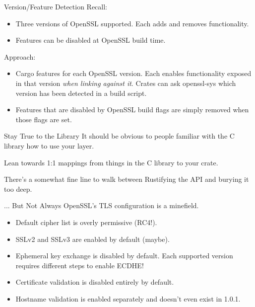 \documentclass{beamer}
\begin{document}
\begin{frame}{Version/Feature Detection}
    Recall:
    \begin{itemize}
        \item Three versions of OpenSSL supported. Each adds and removes
            functionality.
        \item Features can be disabled at OpenSSL build time.
    \end{itemize}

    Approach:
    \begin{itemize}
        \item Cargo features for each OpenSSL version. Each enables
            functionality exposed in that version \emph{when linking against
            it}. Crates can ask openssl-sys which version has been detected in
            a build script.
        \item Features that are disabled by OpenSSL build flags are simply
            removed when those flags are set.
    \end{itemize}
\end{frame}

\begin{frame}{Stay True to the Library}
    It should be obvious to people familiar with the C library how to use your
    layer.

    Lean towards 1:1 mappings from things in the C library to your crate.

    There's a somewhat fine line to walk between Rustifying the API and burying
    it too deep.
\end{frame}

\begin{frame}[fragile]{... But Not Always}
    OpenSSL's TLS configuration is a minefield.

    \begin{itemize}
        \item Default cipher list is overly permissive (RC4!).
        \item SSLv2 and SSLv3 are enabled by default (maybe).
        \item Ephemeral key exchange is disabled by default. Each supported
            version requires different steps to enable ECDHE!
        \item Certificate validation is disabled entirely by default.
        \item Hostname validation is enabled separately and doesn't even exist
            in 1.0.1.
    \end{itemize}
\end{frame}
\end{document}
